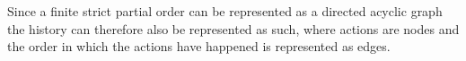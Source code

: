     \newpar Since a finite strict partial order can be represented as a directed acyclic graph the history can therefore also be represented as such, where actions are nodes and the order in which the actions have happened is represented as edges.

	

	
	
%	
%	
%	
%	
